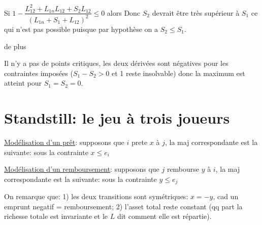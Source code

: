 \documentclass[11pt,oneside,twocolumn]{article}
\begin{document}
Si 
$1 - \dfrac{L_{12}^2 + L_{1n}L_{12} + S_{2}L_{12}}{(L_{1n}+S_{1}+L_{12})^2} \leq 0$ alors 
Donc $S_{2}$ devrait être très supérieur à $S_{1}$ ce qui n'est pas possible puisque par hypothèse on a $S_{2} \leq S_{1}$.

de plus


Il n'y a pas de points critiques, les deux dérivées sont négatives pour les contraintes imposées ($S_{1} - S_{2} > 0$ et 1 reste insolvable)  donc la maximum est atteint pour $S_{1}=S_{2}=0$.

\section{Standstill: le jeu à trois joueurs}\label{stand}
\underline{Modélisation d'un prêt}: supposons que $i$ prete $x$ à $j$,
la maj correspondante est la suivante:
sous la contrainte $x\leq e_i$

\underline{Modélisation d'un remboursement}: supposons que $j$ rembourse $y$ à $i$,
la maj correspondante est la suivante:
sous la contrainte $y\leq e_j$

On remarque que: 
1) les deux transitions sont symétriques: $x=-y$,
cad un emprunt negatif = remboursement;
2) l'asset total reste constant (qq part la richesse totale est invariante
et le $L$ dit comment elle est répartie).
\end{document}
